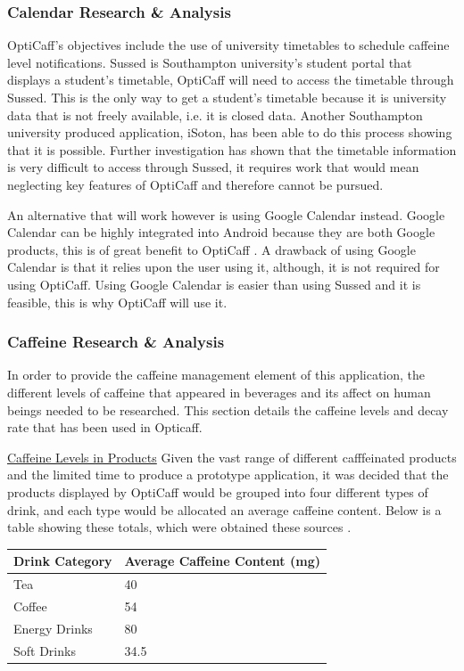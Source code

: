 \subsubsection{Calendar Research \& Analysis}
\label{sec:calendar}
OptiCaff’s objectives include the use of university timetables to schedule caffeine level notifications. Sussed is Southampton university’s student portal that displays a student’s timetable, OptiCaff will need to access the timetable through Sussed. This is the only way to get a student’s timetable because it is university data that is not freely available, i.e. it is closed data. Another Southampton university produced application, iSoton, has been able to do this process showing that it is possible. Further investigation has shown that the timetable information is very difficult to access through Sussed, it requires work that would mean neglecting key features of OptiCaff and therefore cannot be pursued.

An alternative that will work however is using Google Calendar instead. Google Calendar can be highly integrated into Android because they are both Google products, this is of great benefit to OptiCaff \cite{calendar}. A drawback of using Google Calendar is that it relies upon the user using it, although, it is not required for using OptiCaff. Using Google Calendar is easier than using Sussed and it is feasible, this is why OptiCaff will use it.

\subsubsection{Caffeine Research \& Analysis}
\label{sec:Caffeine}

In order to provide the caffeine management element of this application, the different levels of caffeine that appeared in beverages and its affect on human beings needed to be researched. This section details the caffeine levels and decay rate that has been used in Opticaff. 

\underline{Caffeine Levels in Products} \newline
Given the vast range of different cafffeinated products and the limited time to produce a prototype application, it was decided that the products displayed by OptiCaff would be grouped into four different types of drink, and each type would be allocated an average caffeine content. Below is a table showing these totals, which were obtained these sources \cite{Coke} \cite{TeaCoffee} \cite{EnergyDrink}.

\begin{center}
\begin{tabular}{|l|l|}
\hline
\textbf{Drink Category} & \textbf{Average Caffeine Content (mg)} \\\hline
Tea & 40 \\\hline
Coffee & 54 \\\hline
Energy Drinks & 80 \\\hline
Soft Drinks & 34.5 \\\hline
\end{tabular}
\end{center}

